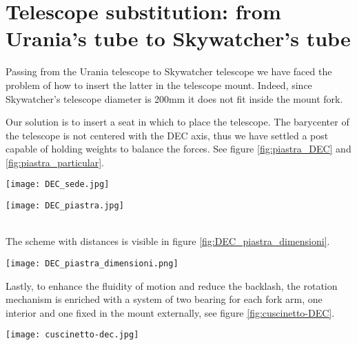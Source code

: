 \section{Telescope substitution: from Urania's tube to Skywatcher's tube}
Passing from the Urania telescope to Skywatcher telescope we have faced the problem of how to insert the latter in the telescope mount.
Indeed, since Skywatcher's telescope diameter is 200mm it does not fit inside the mount fork.

Our solution is to insert a seat in which to place the telescope.
The barycenter of the telescope is not centered with the DEC axis, thus we have settled a post capable of holding weights to balance the forces.
See figure \ref{fig:piastra_DEC} and \ref{fig:piastra_particular}.
\\
\begin{minipage}{0.25\textwidth}
    \centering
    \texttt{[image: DEC\_sede.jpg]}
    \label{fig:piastra_DEC}
\end{minipage}
\begin{minipage}
    {0.25\textwidth}
    \centering
    \texttt{[image: DEC\_piastra.jpg]}
    \label{fig:piastra_particular}
\end{minipage}
\\
The scheme with distances is visible in figure \ref{fig:DEC_piastra_dimensioni}.
\\
\begin{minipage}
    {0.5\textwidth}
    \centering
    \texttt{[image: DEC\_piastra\_dimensioni.png]}
    \label{fig:DEC_piastra_dimensioni}
\end{minipage}

Lastly, to enhance the fluidity of motion and reduce the backlash, the rotation mechanism is enriched with a system of two bearing for each fork arm, one interior and one fixed in the mount externally, see figure \ref{fig:cuscinetto-DEC}.
\\
\begin{minipage}
    {.5\textwidth}
    \centering
    \texttt{[image: cuscinetto-dec.jpg]}
    \label{fig:cuscinetto-DEC}
\end{minipage}